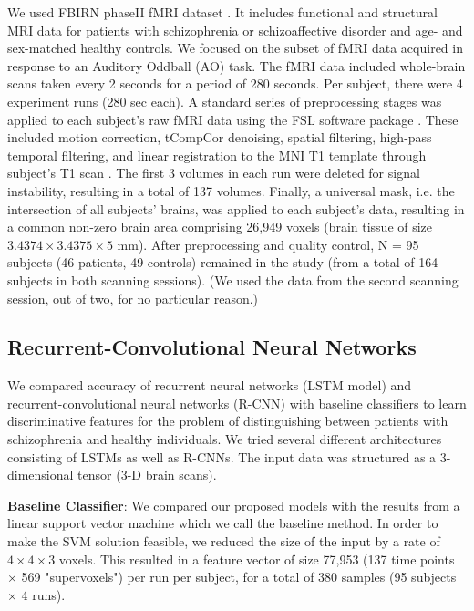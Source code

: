 \documentclass{article}
\begin{document}
We used FBIRN phaseII fMRI dataset \citep{Keator2016}.
It includes functional and structural MRI data for patients with schizophrenia or schizoaffective disorder and age- and sex-matched healthy controls. We focused on the subset of fMRI data acquired in response to an Auditory Oddball (AO) task. 
The fMRI data included whole-brain scans taken every 2 seconds for a period of 280 seconds. Per subject, there were 4 experiment runs (280 sec each).
A standard series of preprocessing stages was applied to each subject's raw fMRI data using the FSL software package \citep{Jenkinson2012}. These included motion correction, tCompCor denoising, spatial filtering, high-pass temporal filtering, and linear registration to the MNI T1 template through subject's T1 scan \citep[see][for a more detailed description of the preprocessing stages]{Gheiratmand2017}. The first 3 volumes in each run were deleted for signal instability, resulting in a total of 137 volumes. Finally, a universal mask, i.e. the intersection of all subjects' brains, was applied to each subject's data, resulting in a common non-zero brain area comprising 26,949 voxels (brain tissue of size $3.4374\times3.4375\times5$ mm).
After preprocessing and quality control, N = 95 subjects (46 patients, 49 controls) remained in the study (from a total of 164 subjects in both scanning sessions). (We used the data from the second scanning session, out of two, for no particular reason.)

\subsection{Recurrent-Convolutional Neural Networks}

We compared accuracy of recurrent neural networks (LSTM model) and recurrent-convolutional neural networks (R-CNN) with baseline classifiers to learn discriminative features for the problem of distinguishing between patients with schizophrenia and healthy individuals. We tried several different architectures consisting of LSTMs as well as R-CNNs. The input data was structured as a 3-dimensional tensor (3-D brain scans). 

\textbf{Baseline Classifier}: We compared our proposed models with the results from a linear support vector machine which we call the baseline method. In order to make the SVM solution feasible, we reduced the size of the input by a rate of $4\times4\times3$ voxels. This resulted in a feature vector of size 77,953 (137 time points $\times$ 569 "supervoxels") per run per subject, for a total of 380 samples (95 subjects $\times$ 4 runs).  
\end{document}
